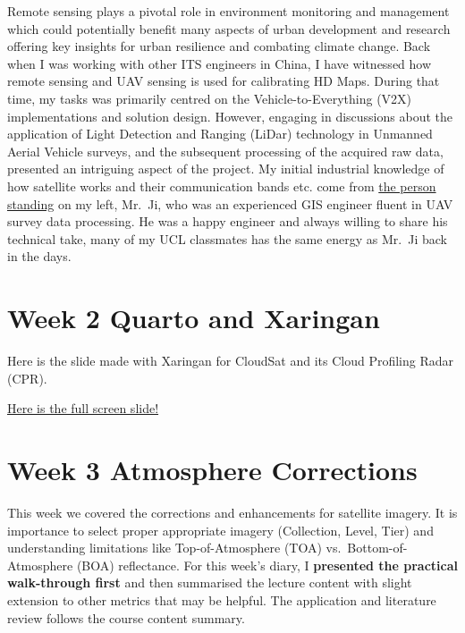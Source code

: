\documentclass[
  letterpaper,
  DIV=11,
  numbers=noendperiod]{scrreprt}
\begin{document}
Remote sensing plays a pivotal role in environment monitoring and
management which could potentially benefit many aspects of urban
development and research offering key insights for urban resilience and
combating climate change. Back when I was working with other ITS
engineers in China, I have witnessed how remote sensing and UAV sensing
is used for calibrating HD Maps. During that time, my tasks was
primarily centred on the Vehicle-to-Everything (V2X) implementations and
solution design. However, engaging in discussions about the application
of Light Detection and Ranging (LiDar) technology in Unmanned Aerial
Vehicle surveys, and the subsequent processing of the acquired raw data,
presented an intriguing aspect of the project. My initial industrial
knowledge of how satellite works and their communication bands etc. come
from \protect\hyperlink{personal-introduction}{the person standing} on
my left, Mr.~Ji, who was an experienced GIS engineer fluent in UAV
survey data processing. He was a happy engineer and always willing to
share his technical take, many of my UCL classmates has the same energy
as Mr.~Ji back in the days.

\hypertarget{week-2-quarto-and-xaringan}{%
\chapter*{Week 2 Quarto and Xaringan}\label{week-2-quarto-and-xaringan}}


Here is the slide made with Xaringan for CloudSat and its Cloud
Profiling Radar (CPR).

\href{https://dereksgithub.github.io/practicalquarto0023/\#1}{Here is
the full screen slide!}

\hypertarget{week-3-atmosphere-corrections}{%
\chapter*{Week 3 Atmosphere
Corrections}\label{week-3-atmosphere-corrections}}


This week we covered the corrections and enhancements for satellite
imagery. It is importance to select proper appropriate imagery
(Collection, Level, Tier) and understanding limitations like
Top-of-Atmosphere (TOA) vs.~Bottom-of-Atmosphere (BOA) reflectance. For
this week's diary, I \textbf{presented the practical walk-through first}
and then summarised the lecture content with slight extension to other
metrics that may be helpful. The application and literature review
follows the course content summary.
\end{document}
